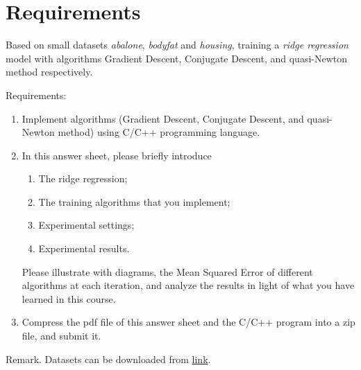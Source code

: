 \section{Requirements}

Based on small datasets \emph{abalone}, \emph{bodyfat} and \emph{housing},
training a \emph{ridge regression} model with algorithms Gradient Descent, 
Conjugate Descent, and quasi-Newton method respectively.

Requirements:
\begin{enumerate}
    \item Implement algorithms (Gradient Descent, Conjugate Descent, and 
        quasi-Newton method) using C/C++ programming language.
    \item In this answer sheet, please briefly introduce
        \begin{enumerate}
            \item The ridge regression;
            \item The training algorithms that you implement;
            \item Experimental settings;
            \item Experimental results.
        \end{enumerate}
        Please illustrate with diagrams, the Mean Squared Error of different 
        algorithms at each iteration, and analyze the results in light of what
        you have learned in this course.
    \item Compress the pdf file of this answer sheet and the C/C++ program into 
        a zip file, and submit it.
\end{enumerate}

Remark. Datasets can be downloaded from 
\href{https://www.csie.ntu.edu.tw/~cjlin/libsvmtools/datasets/regression.html}{link}.